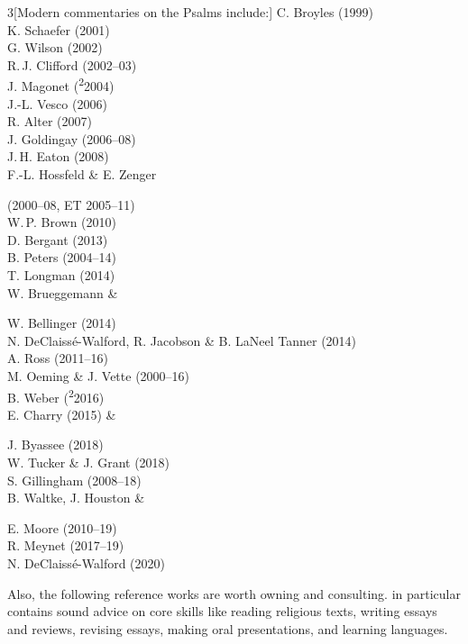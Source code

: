 \documentclass[titlepage]{article}
\begin{document}
\begin{multicols}{3}[Modern commentaries on the Psalms include:]
C. Broyles (1999)\\
K. Schaefer (2001)\\
G. Wilson (2002)\\
R.\,J. Clifford (2002--03)\\
J. Magonet (\textsuperscript{2}2004)\\
J.-L. Vesco (2006)\\
R. Alter (2007)\\
J. Goldingay (2006--08)\\
J.\,H. Eaton (2008)\\
F.-L. Hossfeld \& E. Zenger\par (2000--08, ET 2005--11)\\
W.\,P. Brown (2010)\\
D. Bergant (2013)\\
B. Peters (2004--14)\\
T. Longman (2014)\\
W. Brueggemann \&\par W. Bellinger (2014)\\
N. DeClaissé-Walford, R. Jacobson \& B. LaNeel Tanner (2014)\\
A. Ross (2011--16)\\
M. Oeming \& J. Vette (2000--16)\\
B. Weber (\textsuperscript{2}2016)\\
E. Charry (2015) \&\par J. Byassee (2018)\\
W. Tucker \& J. Grant (2018)\\
S. Gillingham (2008--18)\\
B. Waltke, J. Houston \&\par E. Moore (2010--19)\\
R. Meynet (2017--19)\\
N. DeClaissé-Walford (2020)
\end{multicols}

Also, the following reference works are worth owning and consulting.
\cite{rlgs} in particular contains sound advice on core skills like
reading religious texts, writing essays and reviews, revising essays,
making oral presentations, and learning languages.
\end{document}
